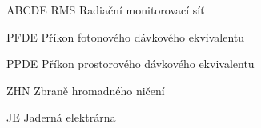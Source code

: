 \begin{seznamzkratek}{ABCDE}
	      {RMS}
	      {Radiační monitorovací síť}	  
	     	  
	      {PFDE}
	      {Příkon fotonového dávkového ekvivalentu}
	     	  
	      {PPDE}
	      {Příkon prostorového dávkového ekvivalentu}
	     	  
	      {ZHN}
	      {Zbraně hromadného ničení}
	     	     	  
	      {JE}
	      {Jaderná elektrárna}
	     	  
	 	\novazkratka{}	
	      {}
	      {}
	     	  
	 	\novazkratka{}	
	      {}
	      {}
	     	  
	 	\novazkratka{}	
	      {}
	      {}
	      	            	      

\end{seznamzkratek}